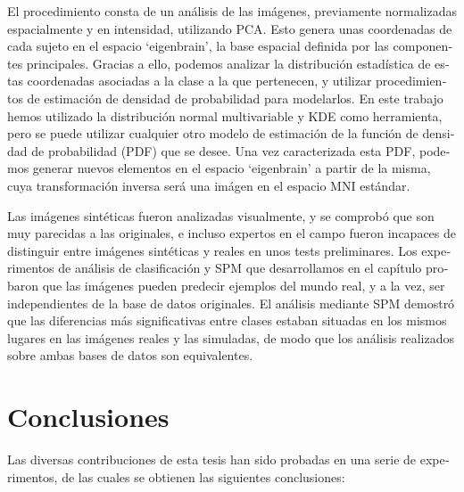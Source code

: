 \begin{otherlanguage}{spanish}
El procedimiento consta de un análisis de las imágenes, previamente normalizadas espacialmente y en intensidad, utilizando \acs{PCA}. Esto genera unas coordenadas de cada sujeto en el espacio `eigenbrain', la base espacial definida por las componentes principales. Gracias a ello, podemos analizar la distribución estadística de estas coordenadas asociadas a la clase a la que pertenecen, y utilizar procedimientos de estimación de densidad de probabilidad para modelarlos. En este trabajo hemos utilizado la distribución normal multivariable y \acf{KDE} como herramienta, pero se puede utilizar cualquier otro modelo de estimación de la función de densidad de probabilidad (\acs{PDF}) que se desee. Una vez caracterizada esta \acs{PDF}, podemos generar nuevos elementos en el espacio `eigenbrain' a partir de la misma, cuya transformación inversa será una imágen en el espacio \acs{MNI} estándar. 

Las imágenes sintéticas fueron analizadas visualmente, y se comprobó que son muy parecidas a las originales, e incluso expertos en el campo fueron incapaces de distinguir entre imágenes sintéticas y reales en unos tests preliminares. Los experimentos de análisis de clasificación y \acs{SPM} que desarrollamos en el capítulo probaron que las imágenes pueden predecir ejemplos del mundo real, y a la vez, ser independientes de la base de datos originales. El análisis mediante \acs{SPM} demostró que las diferencias más significativas entre clases estaban situadas en los mismos lugares en las imágenes reales y las simuladas, de modo que los análisis realizados sobre ambas bases de datos son equivalentes. 

\section*{Conclusiones}
Las diversas contribuciones de esta tesis han sido probadas en una serie de experimentos, de las cuales se obtienen las siguientes conclusiones: 


\end{otherlanguage}

